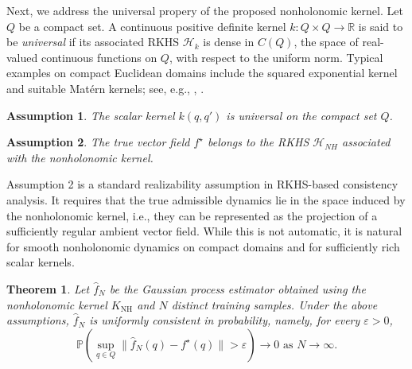 \documentclass[letterpaper, 10 pt, conference]{ieeeconf}
\newtheorem{theorem}{Theorem}
\newtheorem{assumption}{Assumption}
\begin{document}
Next, we address the universal propery of the proposed nonholonomic kernel. Let $Q$ be a compact set. A continuous positive definite kernel $k:Q\times Q\to\mathbb{R}$ is said to be \textit{universal} if its associated RKHS $\mathcal H_k$ is dense in $C(Q)$, the space of real-valued continuous functions on $Q$, with respect to the uniform norm. Typical examples on compact Euclidean domains include the squared exponential kernel and suitable Mat\'ern kernels; see, e.g., \cite{steinwart2008support}, \cite{sriperumbudur2011universality}.


\begin{assumption}
The scalar kernel $k(q,q')$ is universal on the compact set $Q$.
\end{assumption}

\begin{assumption}
The true vector field $f^\star$ belongs to the RKHS $\mathcal H_{NH}$ associated with the nonholonomic kernel.
\end{assumption}



Assumption 2 is a standard realizability assumption in RKHS-based consistency analysis. It requires that the true admissible dynamics lie in the space induced by the nonholonomic kernel, i.e., they can be represented as the projection of a sufficiently regular ambient vector field. While this is not automatic, it is natural for smooth nonholonomic dynamics on compact domains and for sufficiently rich scalar kernels.

\begin{theorem}
Let $\hat f_N$ be the Gaussian process estimator obtained using the nonholonomic kernel $K_{\mathrm{NH}}$ and $N$ distinct training samples. Under the above assumptions, $\hat f_N$ is uniformly consistent in probability, namely, for every $\varepsilon>0$,
\[
\mathbb{P}\!\left(
\sup_{q\in Q}\|\hat f_N(q)-f^\star(q)\|>\varepsilon
\right)\to 0\,\, \text{as } N\to\infty.
\]
\end{theorem}
\end{document}
